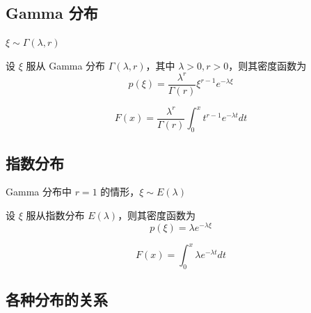 \documentclass[12pt,a4paper]{amsart}
\begin{document}
\subsection{Gamma 分布}

$\xi\sim \Gamma(\lambda, r)$

\begin{definition}[Gamma 分布]
    设 $\xi$ 服从 Gamma 分布 $\Gamma(\lambda, r)$，其中 $\lambda>0, r>0$，则其密度函数为
    \begin{equation}
        p(\xi) = \frac{\lambda^r}{\Gamma(r)}\xi^{r-1}e^{-\lambda\xi}
    \end{equation}
\end{definition}

\begin{proposition}
    \begin{equation}
        F(x) = \frac{\lambda^r}{\Gamma(r)}\int_{0}^{x}t^{r-1}e^{-\lambda t}dt
    \end{equation}
\end{proposition}

\subsection{指数分布}

Gamma 分布中 $r=1$ 的情形，$\xi\sim E(\lambda)$

\begin{definition}[指数分布]
    设 $\xi$ 服从指数分布 $E(\lambda)$，则其密度函数为
    \begin{equation}
        p(\xi) = \lambda e^{-\lambda\xi}
    \end{equation}
\end{definition}

\begin{proposition}[指数分布的分布函数]
    \begin{equation}
        F(x) = \int_{0}^{x}\lambda e^{-\lambda t}dt
    \end{equation}
\end{proposition}

\subsection{各种分布的关系}
\end{document}
